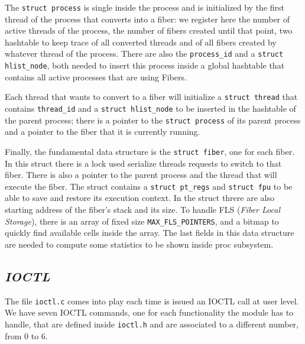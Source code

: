 \documentclass[a4paper]{article}
\begin{document}
The \texttt{struct process} is single inside the process and is initialized by the first thread of the process that converts into a fiber: we register here the number of active threads of the process, the number of fibers created until that point, two hashtable to keep trace of all converted threads and of all fibers created by whatever thread of the process. There are also the \texttt{process\_id} and a \texttt{struct hlist\_node}, both needed to insert this process inside a global hashtable that contains all active processes that are using Fibers.\bigskip\\



\bigskip

Each thread that wants to convert to a fiber will initialize a \texttt{struct thread} that contains \texttt{thread\_id} and a \texttt{struct hlist\_node} to be inserted in the hashtable of the parent process; there is a pointer to the \texttt{struct process} of its parent process and a pointer to the fiber that it is currently running.\bigskip\\



\bigskip

Finally, the fundamental data structure is the \texttt{struct fiber}, one for each fiber. In this struct there is a lock used serialize threads requests to switch to that fiber. There is also a pointer to the parent process and the thread that will execute the fiber. The struct contains a \texttt{struct pt\_regs} and \texttt{struct fpu} to be able to save and restore its execution context. In the struct threre are also starting address of the fiber's stack and its size. To handle FLS (\textit{Fiber Local Storage}), there is an array of fixed size \texttt{MAX\_FLS\_POINTERS}, and a bitmap to quickly find available cells inside the array. The last fields in this data structure are needed to compute some statistics to be shown inside proc subsystem.\bigskip\\



\bigskip

\subsection*{\textit{IOCTL}}
The file \texttt{ioctl.c} comes into play each time is issued an IOCTL call at user level. We have seven IOCTL commands, one for each functionality the module has to handle, that are defined inside \texttt{ioctl.h} and are associated to a different number, from 0 to 6.
\end{document}
